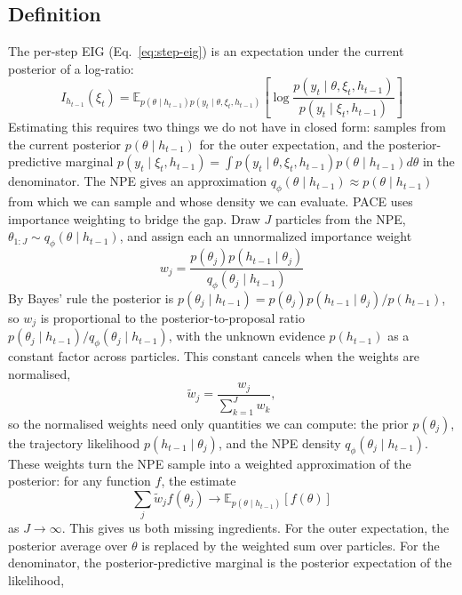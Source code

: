 \subsection{Definition}
\label{sec:m-pacedef}


The per-step EIG (Eq.~\eqref{eq:step-eig}) is an expectation under the current posterior of a log-ratio:
\begin{equation}
\label{eq:eig-recall}
I_{h_{t-1}}(\xi_t) = \mathbb{E}_{p(\theta\mid h_{t-1})p(y_t\mid\theta,\xi_t,h_{t-1})}
\left[\log\frac{p(y_t\mid\theta,\xi_t,h_{t-1})}{p(y_t\mid\xi_t,h_{t-1})}\right]
\end{equation}
Estimating this requires two things we do not have in closed form: samples from the current posterior $p(\theta\mid h_{t-1})$ for the outer expectation, and the posterior-predictive marginal $p(y_t\mid\xi_t,h_{t-1})=\int p(y_t\mid\theta,\xi_t,h_{t-1})p(\theta\mid h_{t-1}) d\theta$ in the denominator. The NPE gives an approximation $q_\phi(\theta\mid h_{t-1})\approx p(\theta\mid h_{t-1})$ from which we can sample and whose density we can evaluate. PACE uses importance weighting to bridge the gap. Draw $J$ particles from the NPE, $\theta_{1:J}\sim q_\phi(\theta\mid h_{t-1})$, and assign each an unnormalized importance weight
\begin{equation}
\label{eq:weights}
w_j = \frac{p(\theta_j)p(h_{t-1}\mid\theta_j)}{q_\phi(\theta_j\mid h_{t-1})}
\end{equation}
By Bayes' rule the posterior is $p(\theta_j\mid h_{t-1})=p(\theta_j)p(h_{t-1}\mid\theta_j)/p(h_{t-1})$, so $w_j$ is proportional to the posterior-to-proposal ratio $p(\theta_j\mid h_{t-1})/q_\phi(\theta_j\mid h_{t-1})$, with the unknown evidence $p(h_{t-1})$ as a constant factor across particles. This constant cancels when the weights are normalised,
\begin{equation}
\label{eq:wnorm}
\tilde w_j = \frac{w_j}{\sum_{k=1}^{J}w_k},
\end{equation}
so the normalised weights need only quantities we can compute: the prior $p(\theta_j)$, the trajectory likelihood $p(h_{t-1}\mid\theta_j)$, and the NPE density $q_\phi(\theta_j\mid h_{t-1})$. These weights turn the NPE sample into a weighted approximation of the posterior: for any function $f$, the estimate $$\sum_j\tilde w_jf(\theta_j)\to\mathbb{E}_{p(\theta\mid h_{t-1})}[f(\theta)]$$ as $J\to\infty$. This gives us both missing ingredients. For the outer expectation, the posterior average over $\theta$ is replaced by the weighted sum over particles. For the denominator, the posterior-predictive marginal is the posterior expectation of the likelihood,
